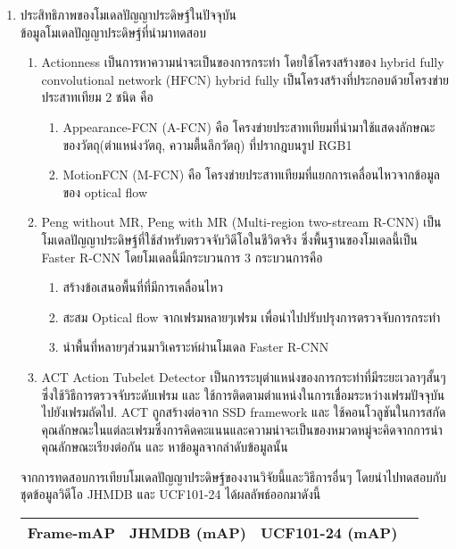 \begin{enumerate}
\begin{enumerate}
\begin{enumerate}
		\end{enumerate}
		\item ประสิทธิภาพของโมเดลปัญญาประดิษฐ์ในปัจจุบัน
		\\ข้อมูลโมเดลปัญญาประดิษฐ์ที่นำมาทดสอบ
		\begin{enumerate}				
			\item Actionness\textsuperscript{\cite{actioness}} เป็นการหาความน่าจะเป็นของการกระทำ โดยใช้โครงสร้างของ hybrid fully convolutional network (HFCN) hybrid fully เป็นโครงสร้างที่ประกอบด้วยโครงข่ายประสาทเทียม 2 ชนิด คือ
			\begin{enumerate}
				\item Appearance-FCN (A-FCN) คือ โครงข่ายประสาทเทียมที่นำมาใช้แสดงลักษณะของวัตถุ(ตำแหน่งวัตถุ, ความตื้นลึกวัตถุ) ที่ปรากฎบนรูป RGB1
				\item MotionFCN (M-FCN) คือ โครงข่ายประสาทเทียมที่แยกการเคลื่อนไหวจากข้อมูลของ optical flow
			 \end{enumerate}
			\item Peng without MR, Peng with MR (Multi-region two-stream R-CNN)\textsuperscript{\cite{peng}} เป็นโมเดลปัญญาประดิษฐ์ที่ใช้สำหรับตรวจจับวิดีโอในชีวิตจริง ซึ่งพื้นฐานของโมเดลนี้เป็น Faster R-CNN โดยโมเดลนี้มีกระบวนการ 3 กระบวนการคือ
			\begin{enumerate}
					\item สร้างข้อเสนอพื้นที่ที่มีการเคลื่อนไหว
					\item สะสม Optical flow จากเฟรมหลายๆเฟรม เพื่อนำไปปรับปรุงการตรวจจับการกระทำ
					\item นำพื้นที่หลายๆส่วนมาวิเคราะห์ผ่านโมเดล Faster R-CNN
			\end{enumerate}
			\item ACT Action Tubelet Detector\textsuperscript{\cite{act}} เป็นการระบุตำแหน่งของการกระทำที่มีระยะเวลาๆสั้นๆ ซึ่งใช้วิธีการตรวจจับระดับเฟรม และ ใช้การติดตามตำแหน่งในการเชื่อมระหว่างเฟรมปัจจุบันไปยังเฟรมถัดไป. ACT ถูกสร้างต่อจาก SSD framework และ ใช้คอนโวลูชันในการสกัดคุณลักษณะในแต่ละเฟรมซึ่งการคิดคะแนนและความน่าจะเป็นของหมวดหมู่จะคิดจากการนำคุณลักษณะเรียงต่อกัน และ หาข้อมูลจากลำดับข้อมูลนั้น
		\end{enumerate}
		จากการทดสอบการเทียบโมเดลปัญญาประดิษฐ์ของงานวิจัยนี้และวิธีการอื่นๆ โดยนำไปทดสอบกับชุดข้อมูลวิดีโอ JHMDB และ UCF101-24 ได้ผลลัพธ์ออกมาดังนี้
			\begin{table}[!ht]
				\centering
				\begin{tabular}{|c|c|c|c|}
					\hline
					{Frame-mAP}&{JHMDB (mAP)}&{UCF101-24 (mAP)}								\\
					\hline

\end{tabular}
\end{table}
\end{enumerate}
\end{enumerate}

